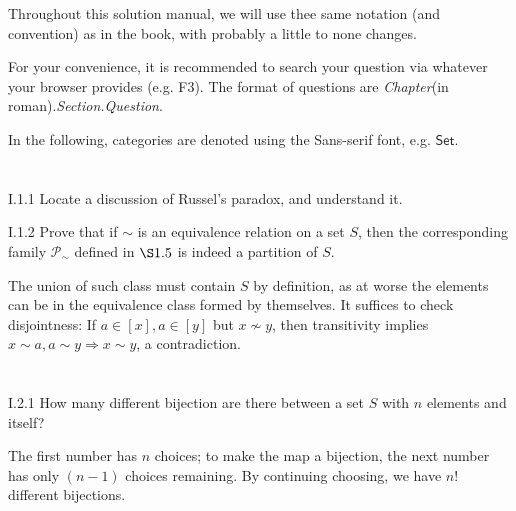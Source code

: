 Throughout this solution manual, we will use thee same notation (and convention) as in the book, with probably a little to none changes.

For your convenience, it is recommended to search your question via whatever your browser provides (e.g. F3). The format of questions are \textit{Chapter}(in roman).\textit{Section.Question}.

In the following, categories are denoted using the \textsf{Sans-serif} font, e.g. $\mathsf{Set}$.

\section{}
\begin{problem}{I.1.1}
Locate a discussion of Russel's paradox, and understand it.
\end{problem}

\begin{problem}{I.1.2}
Prove that if $\sim$ is an equivalence relation on a set $S$, then the corresponding family $\mathscr{P}_\sim$ defined in $\S 1.5$ is indeed a partition of $S$.
\end{problem}
\begin{pf}
The union of such class must contain $S$ by definition, as at worse the elements can be in the equivalence class formed by themselves. It suffices to check disjointness: If $a \in [x], a \in [y]$ but $x \nsim y$, then transitivity implies $x \sim a, a \sim y \Rightarrow x \sim y$, a contradiction. 
\end{pf}

\section{}
\begin{problem}{I.2.1}
How many different bijection are there between a set $S$ with $n$ elements and itself?
\end{problem}
\begin{sol}
The first number has $n$ choices; to make the map a bijection, the next number has only $(n-1)$ choices remaining. By continuing choosing, we have $n!$ different bijections.
\end{sol}

